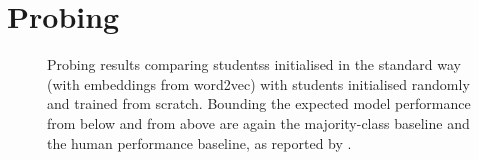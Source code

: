 \documentclass[bsc,frontabs,twoside,singlespacing,parskip,deptreport]{infthesis}
\begin{document}
\chapter{Probing}{
  \label{chap:A-probing}
  \begin{figure}[h!tb]
    \centering
    \caption{Probing results comparing studentss initialised in the standard way (with embeddings from word2vec) with students initialised randomly and trained from scratch. Bounding the expected model performance from below and from above are again the majority-class baseline and the human performance baseline, as reported by \citet{Conneau_2018}.}
    \label{fig:probing-students-scratch}
  \end{figure}
}
\end{document}
